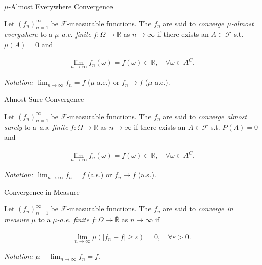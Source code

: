 \documentclass[10pt,landscape]{article}
\renewcommand{\geq}{\geqslant}
\newcommand{\CalF}{\mathcal{F}}
\begin{document}
\begin{multicols}{3}
\begin{definition}{5.1}{$\mu$-Almost Everywhere Convergence}

    Let $(f_n)_{n=1}^{\infty}$ be $\CalF$-measurable functions. The $f_n$ are said to \emph{converge $\mu$-almost everywhere} to a \emph{$\mu$-a.e. finite} $f: \Omega \to \overline{\mathbb{R}}$ as $n \to \infty$ if there exists an $A \in \CalF$ s.t. $\mu(A) = 0$ and

        \begin{align*}
            \lim_{n \to \infty} f_n(\omega) = f(\omega) \in \mathbb{R}, \quad \forall \omega \in A^C.
        \end{align*}

    \emph{Notation:} $\lim_{n \to \infty} f_n = f$ ($\mu$-a.e.) or $f_n \to f$ ($\mu$-a.e.).

\end{definition}

\begin{definition}{5.1}{Almost Sure Convergence}

    Let $(f_n)_{n=1}^{\infty}$ be $\CalF$-measurable functions. The $f_n$ are said to \emph{converge almost surely} to a \emph{a.s. finite} $f: \Omega \to \overline{\mathbb{R}}$ as $n \to \infty$ if there exists an $A \in \CalF$ s.t. $P(A) = 0$ and

        \begin{align*}
            \lim_{n \to \infty} f_n(\omega) = f(\omega) \in \mathbb{R}, \quad \forall \omega \in A^C.
        \end{align*}

    \emph{Notation:} $\lim_{n \to \infty} f_n = f$ (a.s.) or $f_n \to f$ (a.s.).

\end{definition}

\begin{definition}{5.2}{Convergence in Measure}

    Let $(f_n)_{n=1}^{\infty}$ be $\CalF$-measurable functions. The $f_n$ are said to \emph{converge in measure $\mu$} to a \emph{$\mu$-a.e. finite} $f: \Omega \to \overline{\mathbb{R}}$ as $n \to \infty$ if

        \begin{align*}
            \lim_{n \to \infty} \mu(|f_n - f| \geq \varepsilon) = 0, \quad \forall \varepsilon > 0.
        \end{align*}

    \emph{Notation:} $\mu-\lim_{n \to \infty} f_n = f$.

\end{definition}


\end{multicols}
\end{document}
